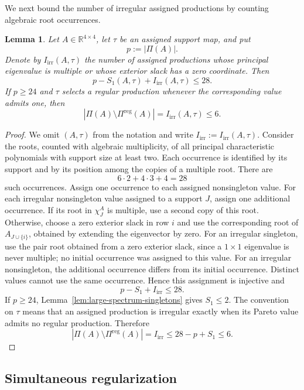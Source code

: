 \documentclass[11pt,a4paper]{article}
\newtheorem{lemma}[theorem]{Lemma}
\theoremstyle{definition}
\newcommand{\R}{\mathbb R}
\begin{document}
We next bound the number of irregular assigned productions by counting
algebraic root occurrences.

\begin{lemma}
\label{lem:irregular-occurrence-budget}
Let $A\in\R^{4\times4}$, let $\tau$ be an assigned support map, and put
$$
p:=|\Pi(A)|.
$$
Denote by $I_{\mathrm{irr}}(A,\tau)$ the number of assigned
productions whose principal eigenvalue is multiple or whose exterior
slack has a zero coordinate. Then
$$
p-S_1(A,\tau)+I_{\mathrm{irr}}(A,\tau)\leq28.
$$
If $p\geq24$ and $\tau$ selects a regular production whenever the
corresponding value admits one, then
$$
|\Pi(A)\setminus\Pi^{\mathrm{reg}}(A)|
=
I_{\mathrm{irr}}(A,\tau)
\leq6.
$$
\end{lemma}

\begin{proof}
We omit $(A,\tau)$ from the notation and write
$I_{\mathrm{irr}}:=I_{\mathrm{irr}}(A,\tau)$. Consider the roots,
counted with algebraic multiplicity, of all principal characteristic
polynomials with support size at least two. Each occurrence is
identified by its support and by its position among the copies of a
multiple root. There are
$$
6\cdot2+4\cdot3+4=28
$$
such occurrences. Assign one occurrence to each assigned nonsingleton
value. For each irregular nonsingleton value assigned to a support $J$,
assign one additional occurrence. If its root in $\chi_J^A$ is
multiple, use a second copy of this root. Otherwise, choose a zero
exterior slack in row $i$ and use the corresponding root of
$A_{J\cup\{i\}}$, obtained by extending the eigenvector by zero. For an
irregular singleton, use the pair root obtained from a zero exterior
slack, since a $1\times1$ eigenvalue is never multiple; no initial
occurrence was assigned to this value. For an irregular nonsingleton,
the additional occurrence differs from its initial occurrence.
Distinct values cannot use the same occurrence. Hence this assignment
is injective and
$$
p-S_1+I_{\mathrm{irr}}\leq28.
$$
If $p\geq24$, Lemma~\ref{lem:large-spectrum-singletons} gives
$S_1\leq2$. The convention on $\tau$ means that an assigned production
is irregular exactly when its Pareto value admits no regular
production. Therefore
$$
|\Pi(A)\setminus\Pi^{\mathrm{reg}}(A)|
=I_{\mathrm{irr}}
\leq28-p+S_1
\leq6.
$$
\end{proof}

\subsection{Simultaneous regularization}
\end{document}
